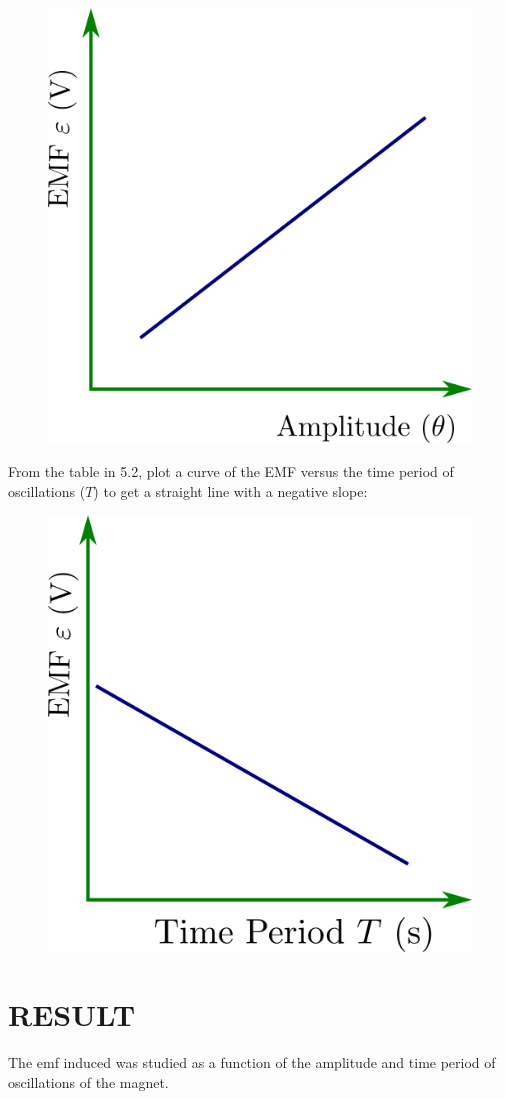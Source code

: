 \documentclass[12pt,a4paper]{article}
\begin{document}
				\begin{figure}[!htb]
					\centering
					\includegraphics{E-v-theta.png}
					\caption{}
				\end{figure}	
				
				From the table in 5.2, plot a curve of the EMF versus the time period of oscillations ($T$) to get a straight line with a negative slope:
				
				\begin{figure}[!htb]
					\centering
					\includegraphics{E-v-T.png}
					\caption{}
				\end{figure}
				
				\section{RESULT}	
				
				The emf induced was studied as a function of the amplitude and time period of oscillations of the magnet. 	
\end{document}
